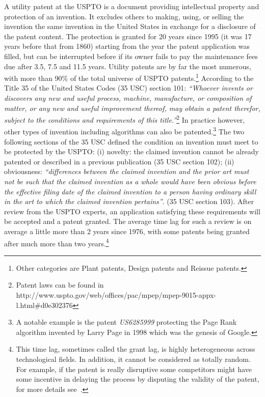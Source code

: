 \documentclass[article]{article}%
\begin{document}
A utility patent at the USPTO is a document providing intellectual property and protection of an invention. It excludes others to making, using, or selling the invention the same invention in the United States in exchange for a disclosure of the patent content. The protection is granted for 20 years since 1995 (it was 17 years before that from 1860) starting from the year the patent application was filled, but can be interrupted before if its owner fails to pay the maintenance fees due after 3.5, 7.5 and 11.5 years. Utility patents are by far the most numerous, with more than 90\% of the total universe of USPTO patents.\footnote{Other categories are Plant patents, Design patents and Reissue patents.} According to the Title 35 of the United States Codes (35 USC) section 101: \textit{``Whoever invents or discovers any new and useful process, machine, manufacture, or composition of matter, or any new and useful improvement thereof, may obtain a patent therefor, subject to the conditions and requirements of this title.''}\footnote{%
Patent laws can be found in http://www.uspto.gov/web/offices/pac/mpep/mpep-9015-appx-l.html\#d0e302376} In practice however, other types of invention including algorithms can also be patented.\footnote{A notable example is the patent \textit{US6285999} protecting the Page Rank algorithm invented by Larry Page in 1998 which was the genesis of Google.} The two following sections of the 35 USC defined the condition an invention must meet to be protected by the USPTO: (i) novelty: the claimed invention cannot be already patented or described in a previous publication (35 USC section 102); (ii) obviousness: \textit{``differences between the claimed invention and the prior art must not be such that the claimed invention as a whole would have been obvious before the effective filing date of the claimed invention to a person having ordinary skill in the art to which the claimed invention pertains''}. (35 USC section 103). After review from the USPTO experts, an application satisfying these requirements will be accepted and a patent granted. The average time lag for such a review is on average a little more than 2 years since 1976, with some patents being granted after much more than two years.\footnote{This time lag, sometimes called the grant lag, is highly heterogeneous across technological fields. In addition, it cannot be considered as totally random. For example, if the patent is really disruptive some competitors might have some incentive in delaying the process by disputing the validity of the patent, for more details see~\citet{regibeau2010}.}
\end{document}
